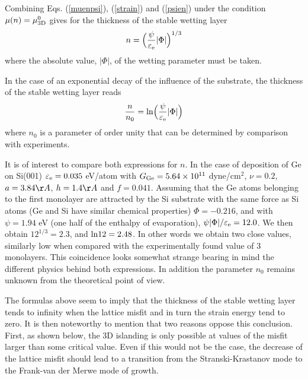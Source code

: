 \documentclass[aps,prl,showpacs,twocolumn,byrevtex,floatfix]{revtex4-1}
\begin{document}
Combining Eqs. (\ref{muenpsi}), (\ref{strain}) and (\ref{psien}) under the
condition $\mu (n) = \mu^0_{\rm 3D}$ gives for the thickness of the stable
wetting layer
\begin{equation}
n = \Bigl(\frac{\psi}{\varepsilon_{\rm e}}|\Phi|\Bigr)^{1/3}
\end{equation}
where the absolute value, $|\Phi|$, of the wetting parameter must be taken.

In the case of an exponential decay of the influence of the substrate, the
thickness of the stable wetting layer reads\cite{Muller96}
\begin{equation}
\frac{n}{n_0} = {\rm ln}\Bigl(\frac{\psi}{\varepsilon_{\rm e}}|\Phi|\Bigr)
\end{equation}
where $n_0$ is a parameter of order unity that can be determined 
by comparison with experiments.\cite{Muller96}

It is of interest to compare both expressions for $n$. In the case of
deposition of Ge on Si(001) $\varepsilon_{\rm e} = 0.035$ eV/atom with $G_{\rm
Ge} = 5.64 \times 10^{11}$ dyne/cm$^2$, $\nu = 0.2$, $a = 3.84\AA$, $h =
1.4\AA$ and $f = 0.041$. Assuming that the Ge atoms belonging to the
first monolayer
are attracted by the Si substrate with the same force as Si atoms (Ge and
Si have similar chemical properties) $\Phi = - 0.216$, and with $\psi = 1.94$
eV (one half of the enthalpy of evaporation), $\psi |\Phi| /\varepsilon _{\rm
e} = 12.0$. We then obtain $12^{1/3} = 2.3$, and ${\rm ln}12 = 2.48$. In other
words we obtain two close values, similarly low when compared with the
experimentally found value of 3 monolayers. This coincidence looks 
somewhat strange bearing in mind the different physics behind both 
expressions. In addition the parameter $n_0$ remains unknown from the 
theoretical point of view.

The formulas above seem to imply that the thickness of the stable wetting layer
tends to infinity when the lattice misfit and in turn the strain energy tend to
zero. It is then noteworthy to mention that two reasons oppose this conclusion.
First, as shown below, the 3D islanding is only possible at values of the misfit
larger than some critical value. Even if this would not be the case, the
decrease of the lattice misfit should lead to a transition from the
Stranski-Krastanov mode to the Frank-van der Merwe mode of growth.
\end{document}
